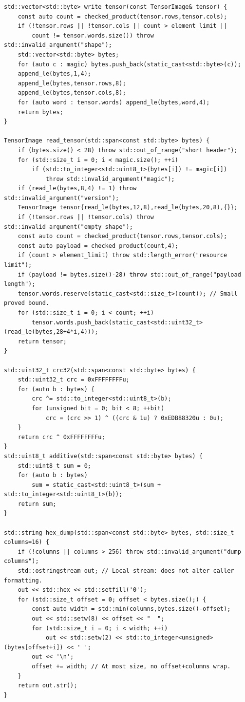 \begin{verbatim}
std::vector<std::byte> write_tensor(const TensorImage& tensor) {
    const auto count = checked_product(tensor.rows,tensor.cols);
    if (!tensor.rows || !tensor.cols || count > element_limit ||
        count != tensor.words.size()) throw std::invalid_argument("shape");
    std::vector<std::byte> bytes;
    for (auto c : magic) bytes.push_back(static_cast<std::byte>(c));
    append_le(bytes,1,4);
    append_le(bytes,tensor.rows,8);
    append_le(bytes,tensor.cols,8);
    for (auto word : tensor.words) append_le(bytes,word,4);
    return bytes;
}

TensorImage read_tensor(std::span<const std::byte> bytes) {
    if (bytes.size() < 28) throw std::out_of_range("short header");
    for (std::size_t i = 0; i < magic.size(); ++i)
        if (std::to_integer<std::uint8_t>(bytes[i]) != magic[i])
            throw std::invalid_argument("magic");
    if (read_le(bytes,8,4) != 1) throw std::invalid_argument("version");
    TensorImage tensor{read_le(bytes,12,8),read_le(bytes,20,8),{}};
    if (!tensor.rows || !tensor.cols) throw std::invalid_argument("empty shape");
    const auto count = checked_product(tensor.rows,tensor.cols);
    const auto payload = checked_product(count,4);
    if (count > element_limit) throw std::length_error("resource limit");
    if (payload != bytes.size()-28) throw std::out_of_range("payload length");
    tensor.words.reserve(static_cast<std::size_t>(count)); // Small proved bound.
    for (std::size_t i = 0; i < count; ++i)
        tensor.words.push_back(static_cast<std::uint32_t>(read_le(bytes,28+4*i,4)));
    return tensor;
}

std::uint32_t crc32(std::span<const std::byte> bytes) {
    std::uint32_t crc = 0xFFFFFFFFu;
    for (auto b : bytes) {
        crc ^= std::to_integer<std::uint8_t>(b);
        for (unsigned bit = 0; bit < 8; ++bit)
            crc = (crc >> 1) ^ ((crc & 1u) ? 0xEDB88320u : 0u);
    }
    return crc ^ 0xFFFFFFFFu;
}
std::uint8_t additive(std::span<const std::byte> bytes) {
    std::uint8_t sum = 0;
    for (auto b : bytes)
        sum = static_cast<std::uint8_t>(sum + std::to_integer<std::uint8_t>(b));
    return sum;
}

std::string hex_dump(std::span<const std::byte> bytes, std::size_t columns=16) {
    if (!columns || columns > 256) throw std::invalid_argument("dump columns");
    std::ostringstream out; // Local stream: does not alter caller formatting.
    out << std::hex << std::setfill('0');
    for (std::size_t offset = 0; offset < bytes.size();) {
        const auto width = std::min(columns,bytes.size()-offset);
        out << std::setw(8) << offset << "  ";
        for (std::size_t i = 0; i < width; ++i)
            out << std::setw(2) << std::to_integer<unsigned>(bytes[offset+i]) << ' ';
        out << '\n';
        offset += width; // At most size, no offset+columns wrap.
    }
    return out.str();
}


\end{verbatim}
